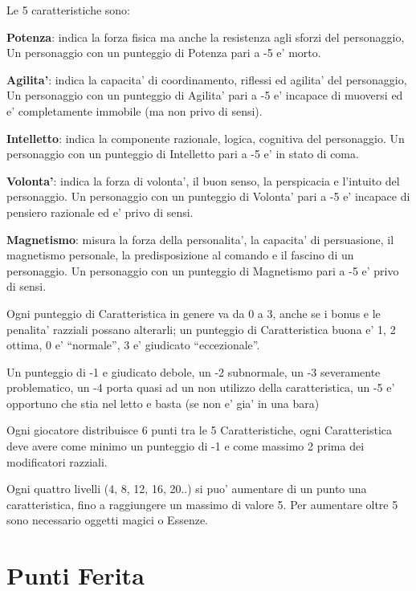 \documentclass[a4paper,11pt,twoside,openany]{dndbook}
\begin{document}
Le 5 caratteristiche sono:

\textbf{Potenza}: indica la forza fisica ma anche la resistenza agli sforzi del personaggio, Un personaggio con un punteggio di Potenza pari a -5 e' morto.

\textbf{Agilita'}: indica la capacita' di coordinamento, riflessi ed agilita' del personaggio, Un personaggio con un punteggio di Agilita' pari a -5 e' incapace di muoversi ed e' completamente immobile (ma non privo di sensi).

\textbf{Intelletto}: indica la componente razionale, logica, cognitiva del personaggio. Un personaggio con un punteggio di Intelletto pari a -5 e' in stato di coma.

\textbf{Volonta'}: indica la forza di volonta', il buon senso, la perspicacia e l'intuito del personaggio. Un personaggio con un punteggio di Volonta' pari a -5 e' incapace di pensiero razionale ed e' privo di sensi.

\textbf{Magnetismo}: misura la forza della personalita', la capacita' di persuasione, il magnetismo personale, la predisposizione al comando e il fascino di un personaggio. Un personaggio con un punteggio di Magnetismo pari a -5 e' privo di sensi.

\smallskip

Ogni punteggio di Caratteristica in genere va da 0 a 3, anche se i bonus e le penalita' razziali possano alterarli; un punteggio di Caratteristica buona e' 1, 2 ottima, 0 e' ``normale'', 3 e' giudicato ``eccezionale''.

Un punteggio di -1 e giudicato debole, un -2 subnormale, un -3 severamente problematico, un -4 porta quasi ad un non utilizzo della caratteristica, un -5 e' opportuno che stia nel letto e basta (se non e' gia' in una bara)

Ogni giocatore distribuisce 6 punti tra le 5 Caratteristiche, ogni Caratteristica deve avere come minimo un punteggio di -1 e come massimo 2 prima dei modificatori razziali.

Ogni quattro livelli (4, 8, 12, 16, 20..) si puo' aumentare di un punto una caratteristica, fino a raggiungere un massimo di valore 5. Per aumentare oltre 5 sono necessario oggetti magici o Essenze.


\section{Punti Ferita}
\end{document}
